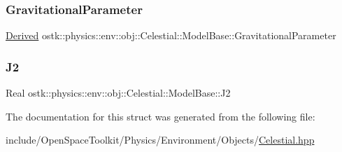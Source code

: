 \subsubsection{\texorpdfstring{Gravitational\+Parameter}{GravitationalParameter}}
{\footnotesize\ttfamily \hyperlink{classostk_1_1physics_1_1units_1_1_derived}{Derived} ostk\+::physics\+::env\+::obj\+::\+Celestial\+::\+Model\+Base\+::\+Gravitational\+Parameter\hspace{0.3cm}{\ttfamily [static]}}

\mbox{\label{structostk_1_1physics_1_1env_1_1obj_1_1_celestial_1_1_model_base_a80c4de90c9b3c463dc194382fa2c028c}} 
\subsubsection{\texorpdfstring{J2}{J2}}
{\footnotesize\ttfamily Real ostk\+::physics\+::env\+::obj\+::\+Celestial\+::\+Model\+Base\+::\+J2\hspace{0.3cm}{\ttfamily [static]}}



The documentation for this struct was generated from the following file\+:\begin{DoxyCompactItemize}
\item 
include/\+Open\+Space\+Toolkit/\+Physics/\+Environment/\+Objects/\hyperlink{_celestial_8hpp}{Celestial.\+hpp}\end{DoxyCompactItemize}
